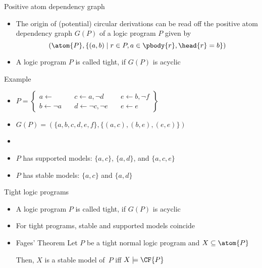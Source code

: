 \begin{frame}{Positive atom dependency graph}
  \bigskip
  \begin{itemize}
  \item<1->
    The origin of (potential) circular derivations can be read off the
    \alert{positive atom dependency graph} $G(P)$ of a logic program $P$
    given by
    \[
    (\atom{P}, \{(a,b) \mid r\in P, a \in \pbody{r}, \head{r}=b\})
    \]
  \item<2-> A logic program $P$ is called \alert{tight}, if $G(P)$ is acyclic
  \end{itemize}
\end{frame}
\begin{frame}[c]{Example}
  \bigskip
  \begin{itemize}
  \item<1-> []
    \par\bigskip
    \(
    P
    =
    \left\{
      \begin{array}{lll}
        a \leftarrow                  \quad &
        c \leftarrow a, \neg d       \quad &
        e \leftarrow b, \neg f
        \\
        b \leftarrow \neg a          \quad &
        d \leftarrow \neg c, \neg e \quad &
        e \leftarrow e
      \end{array}
    \right\}
    \)
    \bigskip
    \bigskip
  \item<2->
    \(
    G(P)= (\{a,b,c,d,e,f\},\{(a,c),(b,e),(e,e)\})
    \)
  \item<3-> []
    \begin{center}
      
    \end{center}
  \item<4-> $P$ has supported models: $\{a,c\}$, $\{a,d\}$, and $\{a,c,e\}$
    \smallskip
  \item<4-> $P$ has stable    models: $\{a,c\}$ and $\{a,d\}$
  \end{itemize}
\end{frame}
\begin{frame}{Tight logic programs}
  \bigskip
  \begin{itemize}
  \item<1-> A logic program $P$ is called \alert{tight}, if $G(P)$ is acyclic
    \medskip
  \item<2-> For tight programs, stable and supported models coincide\pause[3]
    \bigskip
  \item<3->[] \par
    \begin{minipage}[t]{0.8\linewidth}
    \begin{block}{Fages' Theorem}
      Let $P$ be a tight normal logic program and $X\subseteq\atom{P}$
      \par\medskip
      Then, $X$ is a stable model of~$P$ iff $X\models\CF{P}$
    \end{block}
    \end{minipage}
  \end{itemize}
\end{frame}
